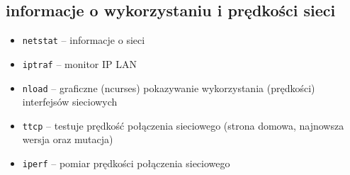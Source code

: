 \subsection{informacje o wykorzystaniu i prędkości sieci}
\begin{itemize}
	\item \Verb#netstat# –
		 informacje o sieci
	\item \Verb#iptraf# –
		monitor IP LAN
	\item \Verb#nload# –
		graficzne (ncurses) pokazywanie wykorzystania (prędkości) interfejsów sieciowych
					
	\item \Verb#ttcp# –
		testuje prędkość połączenia sieciowego (strona domowa, najnowsza wersja oraz mutacja)
	\item \Verb#iperf# –
		pomiar prędkości połączenia sieciowego
\end{itemize}
